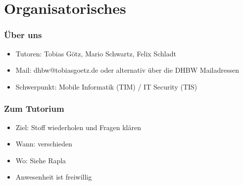 \section{Organisatorisches}
\begin{frame}
    \frametitle{Über uns}
    \begin{itemize}
        \vfill \item Tutoren: Tobias Götz, Mario Schwartz, Felix Schladt
        \vfill \item Mail: dhbw@tobiasgoetz.de oder alternativ über die DHBW Mailadressen
		\vfill \item Schwerpunkt: Mobile Informatik (TIM) / IT Security (TIS)
    \end{itemize}
\end{frame}

\begin{frame}
    \frametitle{Zum Tutorium}
    \begin{itemize}
        \vfill \item Ziel: Stoff wiederholen und Fragen klären
        \vfill \item Wann: verschieden
        \vfill \item Wo: Siehe Rapla
        \vfill \item Anwesenheit ist freiwillig
    \end{itemize}
\end{frame}
